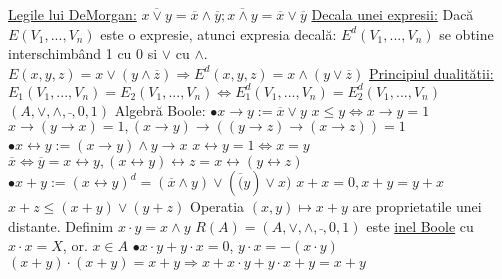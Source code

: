 \documentclass[twocolumn]{article}
\begin{document}
	\noindent\underline{Legile lui DeMorgan:} \newline
	$\overline{x \vee y} = \overline{x} \wedge \overline{y}; \overline{x \wedge y} = \overline{x} \vee \overline{y}$ \newline
	\underline{Decala unei expresii:} \newline
	Dacă $E(V_{1}, ..., V_{n})$ este o expresie, atunci expresia decală: $E^{d}(V_{1}, ..., V_{n})$ se obtine interschimbând 1 cu 0 si $\vee$ cu $\wedge$. $E(x, y, z) = x \vee (y \wedge \overline{z}) \Rightarrow E^{d}(x, y, z) = x \wedge (y \vee \overline{z})$ \newline
	\underline{Principiul dualitătii:} $E_{1}(V_{1}, ..., V_{n}) = E_{2}(V_{1}, ..., V_{n}) \Leftrightarrow E^{d}_{1}(V_{1}, ..., V_{n}) = E^{d}_{2}(V_{1}, ..., V_{n})$ \newline
	$(A, \vee, \wedge, \bar{ }, 0, 1)$ Algebră Boole: \newline
	$\bullet x \rightarrow y := \overline{x} \vee y$ \newline
	$x \leq y \Leftrightarrow x \rightarrow y = 1$ \newline
	$x \rightarrow (y \rightarrow x) = 1, (x \rightarrow y) \rightarrow ((y \rightarrow z) \rightarrow (x \rightarrow z)) = 1$ \newline
	$\bullet x \leftrightarrow y := (x \rightarrow y) \wedge y \rightarrow x$ \newline
	$x \leftrightarrow y = 1 \Leftrightarrow x = y$ \newline
	$\overline{x} \Leftrightarrow \overline{y} = x \leftrightarrow y, (x \leftrightarrow y) \leftrightarrow z = x \leftrightarrow (y \leftrightarrow z)$ \newline
	$\bullet x + y := (x \leftrightarrow y)^{d} = (\overline{x} \wedge y) \vee (\overline(y) \vee x)$ \newline
	$x + x = 0, x + y = y + x$ \newline
	$x + z \leq (x+ y) \vee (y + z)$ \newline
	Operatia $(x, y) \mapsto x + y$ are proprietatile unei distante. \newline
	Definim $x \cdot y = x \wedge y$ \newline
	$R(A) = (A, \vee, \wedge, \bar{ }, 0, 1)$ este \underline{inel Boole} cu $x \cdot x = X$, or. $x \in A$ \newline
	$\bullet x \cdot y  + y \cdot x = 0$, $y \cdot x = - (x \cdot y)$ \newline
	$(x + y) \cdot (x + y) = x + y \Rightarrow x + x \cdot y + y \cdot x + y = x + y$ \newline
\end{document}
